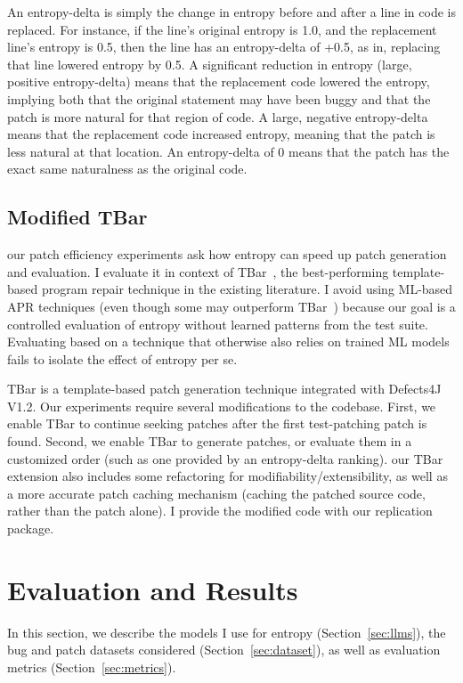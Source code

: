 \documentclass[12pt,openany,oneside,table]{cmuthesis}
\begin{document}
An entropy-delta is simply the change in entropy before and after a line in code
is replaced. For instance, if the line's original entropy is 1.0, and the
replacement line's entropy is 0.5, then the line has an entropy-delta of +0.5,
as in, replacing that line lowered entropy by 0.5. A significant reduction in
entropy (large, positive entropy-delta) means that the replacement code lowered
the entropy, implying both that the original statement may have been buggy and
that the patch is more natural for that region of code. A large, negative
entropy-delta means that the replacement code increased entropy, meaning that
the patch is less natural at that location. An entropy-delta of 0 means that the
patch has the exact same naturalness as the original code.


\subsection{Modified TBar}
\label{sec:entropy-tbar}

our patch efficiency experiments ask how entropy can speed up patch generation
and evaluation.  I evaluate it in context of TBar~\cite{TBar}, the best-performing
template-based program repair technique in the existing literature.  I avoid
using ML-based APR techniques (even though some may outperform TBar~\cite{xia2023automated, TransferFL, Dear}) because our goal is a controlled evaluation of entropy without learned patterns from the test suite.  Evaluating based on a technique that otherwise also relies on trained ML
models fails to isolate the effect of entropy per se.

TBar is a template-based patch generation technique
integrated with Defects4J V1.2. Our experiments require several modifications to the
codebase.  First, we enable TBar to continue seeking patches after the first
test-patching patch is found.  Second, we enable TBar to generate patches, or
evaluate them in a customized order (such as one provided by an entropy-delta ranking).
our TBar extension also includes some refactoring for
modifiability/extensibility, as well as a more accurate patch caching mechanism
(caching the patched source code, rather than the patch alone).  I provide the
modified code with our replication package.


\section{Evaluation and Results}

In this section, we describe the models I use for entropy
(Section~\ref{sec:llms}), the bug and patch datasets considered
(Section~\ref{sec:dataset}), as well as evaluation metrics (Section~\ref{sec:metrics}).
\end{document}
